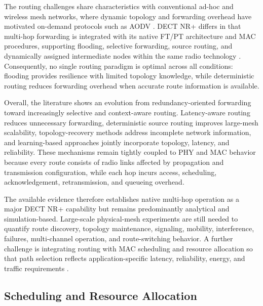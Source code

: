 The routing challenges share characteristics with conventional ad-hoc and wireless mesh networks, where dynamic topology and forwarding overhead have motivated on-demand protocols such as AODV \cite{alameriSystematicReviewModification2022}. DECT NR+ differs in that multi-hop forwarding is integrated with its native FT/PT architecture and MAC procedures, supporting flooding, selective forwarding, source routing, and dynamically assigned intermediate nodes within the same radio technology \cite{etsi_ts103636_4,etsi_ts103636_5, asifURLLCBasedMultiHopCommunication2025, alamDLRoutingPerformance2026a}. Consequently, no single routing paradigm is optimal across all conditions: flooding provides resilience with limited topology knowledge, while deterministic routing reduces forwarding overhead when accurate route information is available.

Overall, the literature shows an evolution from redundancy-oriented forwarding toward increasingly selective and context-aware routing. Latency-aware routing reduces unnecessary forwarding, deterministic source routing improves large-mesh scalability, topology-recovery methods address incomplete network information, and learning-based approaches jointly incorporate topology, latency, and reliability. These mechanisms remain tightly coupled to PHY and MAC behavior because every route consists of radio links affected by propagation and transmission configuration, while each hop incurs access, scheduling, acknowledgement, retransmission, and queueing overhead.

The available evidence therefore establishes native multi-hop operation as a major DECT NR+ capability but remains predominantly analytical and simulation-based. Large-scale physical-mesh experiments are still needed to quantify route discovery, topology maintenance, signaling, mobility, interference, failures, multi-channel operation, and route-switching behavior. A further challenge is integrating routing with MAC scheduling and resource allocation so that path selection reflects application-specific latency, reliability, energy, and traffic requirements \cite{fuhrlingRobustRoutingProtocol2025b, alamDLRoutingPerformance2026a, rauwolfTopologyAwareDeepReinforcement2026a}.


\subsection{Scheduling and Resource Allocation}
\label{subsec:scheduling}


